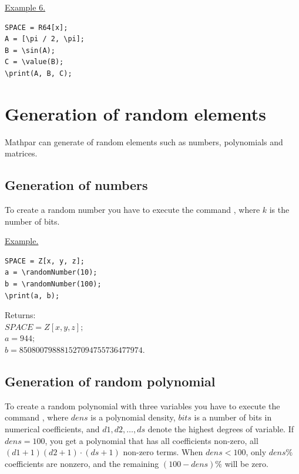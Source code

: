 \underline{Example 6. }
\begin{verbatim}
SPACE = R64[x];
A = [\pi / 2, \pi];
B = \sin(A);
C = \value(B);
\print(A, B, C);
\end{verbatim}


\section{Generation of random elements} 
Mathpar can generate of random elements such as numbers, polynomials and matrices.
\subsection{Generation of numbers} 
To create a random number you have to execute the command 
, where $k$ is the number of bits.

\smallskip


\underline{Example. }

\vspace*{-3mm}

\begin{verbatim}
SPACE = Z[x, y, z];
a = \randomNumber(10);
b = \randomNumber(100);
\print(a, b);
\end{verbatim}

Returns:\\ 
$SPACE=Z[x,y,z]; $\\
$a = 944; $ \\
$b = 850800798881527094755736477974. $

\subsection{Generation of random polynomial} 
To create a random polynomial with three variables you have to execute the command 
, 
where $dens$ is a polynomial density, $bits$ is a number of bits in numerical coefficients, and $d1, d2, \ldots, ds$ denote the highest degrees of variable.
If $dens=100$, you get a polynomial that has all coefficients
non-zero, all $(d1 +1) (d2 +1) \cdot (ds +1)$ non-zero terms. 
When $ dens < 100$, only $ dens \% $ coefficients are nonzero, 
and the remaining $ (100-dens) \% $ will be zero.

